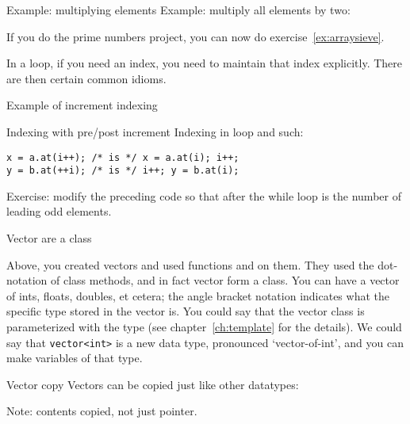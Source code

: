 \begin{block}{Example: multiplying elements}
  \label{sl:range-ref-ex}
Example: multiply all elements by two:
\end{block}

\begin{exercise}
  If you do the prime numbers project, you can now do exercise~\ref{ex:arraysieve}.
\end{exercise}

In a  loop, if you need an index,
you need to maintain that index explicitly.
There are then certain common idioms.

\begin{block}{Example of increment indexing}
  \label{sl:plusplusexample}
\end{block}

\begin{slide}{Indexing with pre/post increment}
  \label{sl:prepostindex}
Indexing in  loop and such:
\begin{lstlisting}
x = a.at(i++); /* is */ x = a.at(i); i++;
y = b.at(++i); /* is */ i++; y = b.at(i);
\end{lstlisting}
\end{slide}

\begin{exercise}
  Exercise: modify the preceding code so that after the while loop
   is the number of leading odd elements.
\end{exercise}

 {Vector are a class}
\label{sec:stdvector}

Above, you created vectors and used functions  and 
on them. They used the dot-notation of class methods, and in fact
vector form a  class. You can have a vector of ints,
floats, doubles, et cetera; 
the angle bracket notation indicates what the specific type stored in
the vector is.
You could say that the vector class is parameterized with the type (see
chapter~\ref{ch:template} for the details). We could say that
\lstinline{vector<int>} is a new data type, pronounced `vector-of-int', and you can
make variables of that type.

\begin{block}{Vector copy}
  \label{sl:vectorcopy}
  Vectors can be copied just like other datatypes:
\begin{cpp4c}
    Note: contents copied, not just pointer.
\end{cpp4c}
\end{block}


